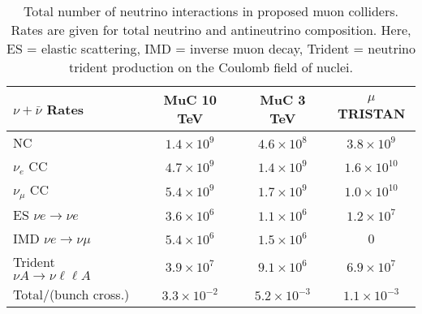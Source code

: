 
\begin{table}[t]
  \centering
  \renewcommand{\arraystretch}{1.25}
  \begin{ruledtabular}
  \begin{tabular}{lccc}
     $\nu+\bar\nu$ Rates 
     & MuC 10 TeV & MuC 3 TeV & $\mu$TRISTAN 
    \\
    \hline
    NC
    & $1.4\times 10^{9}$ & $4.6\times 10^{8}$ & $3.8\times 10^{9}$ 
    \\
    $\nu_e$ CC
    & $4.7\times 10^{9}$ & $1.4\times 10^{9}$ & $1.6\times 10^{10}$ 
    \\
    $\nu_\mu$ CC
    & $5.4\times 10^{9}$ & $1.7\times 10^{9}$ & $1.0\times 10^{10}$ 
    \\
    ES $\nu e \to \nu e$
    & $3.6\times 10^{6}$ & $1.1\times 10^{6}$ & $1.2\times 10^{7}$     
    \\
    IMD $\nu e \to \nu \mu$
    & $5.4\times 10^{6}$ & $1.5\times 10^{6}$ & 0 
    \\
    Trident $\nu A \to \nu \ell \ell A$
    & $3.9\times 10^{7}$ & $9.1\times 10^{6}$ & $6.9\times 10^{7}$ 
    \\ \hline
    Total/(bunch cross.)
    & $3.3\times 10^{-2}$& $5.2\times 10^{-3}$& $1.1\times 10^{-3}$
    \\
\end{tabular}
  \end{ruledtabular}
  \caption{Total number of neutrino interactions in proposed muon colliders.
  Rates are given for total neutrino and antineutrino composition. Here, ES = elastic scattering, IMD = inverse muon decay, Trident = neutrino trident production on the Coulomb field of nuclei.}
  \label{tab:event_rate_makeup}
\end{table}


